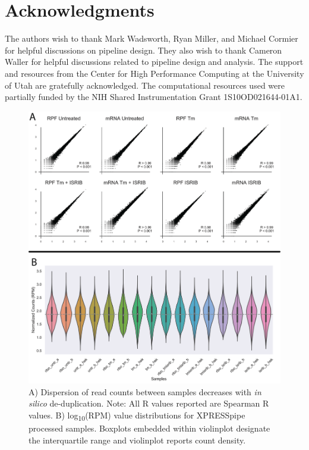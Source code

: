 \documentclass[11pt, a4paper, oneside]{article}
\newcommand{\beginsupplement}{%
  \setcounter{table}{0}
  \renewcommand{\thetable}{S\arabic{table}}%
  \setcounter{figure}{0}
  \renewcommand{\thefigure}{S\arabic{figure}}%
}
\begin{document}
\section*{Acknowledgments}
The authors wish to thank Mark Wadsworth, Ryan Miller, and Michael Cormier for helpful discussions on pipeline design. They also wish to thank Cameron Waller for helpful discussions related to pipeline design and analysis. The support and resources from the Center for High Performance Computing at the University of Utah are gratefully acknowledged. The computational resources used were partially funded by the NIH Shared Instrumentation Grant 1S10OD021644-01A1.





\beginsupplement
\begin{figure}
\centering
  \includegraphics[width=160mm]{figures/xpresspipe_supplement2.png}
  \caption{A) Dispersion of read counts between samples decreases with \textit{in silico} de-duplication. Note: All R values reported are Spearman R values. B) log\textsubscript{10}(RPM) value distributions for XPRESSpipe processed samples. Boxplots embedded within violinplot designate the interquartile range and violinplot reports count density.}
  \label{fig:supplement2}
\end{figure}
\end{document}
